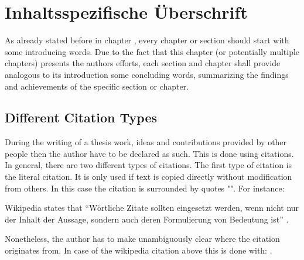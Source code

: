 
\chapter{Inhaltsspezifische Überschrift}
\label{sect:corechapter}


As already stated before in chapter , every chapter or section should start with some introducing words.
Due to the fact that this chapter (or potentially multiple chapters) presents the authors efforts, each section and chapter shall provide analogous to its introduction some concluding words, summarizing the findings and achievements of the specific section or chapter.


\section{Different Citation Types}

During the writing of a thesis work, ideas and contributions provided by other people then the author have to be declared as such.
This is done using citations.
In general, there are two different types of citations.
The first type of citation is the literal citation.
It is only used if text is copied directly without modification from others.
In this case the citation is surrounded by quotes "".
For instance:
\begin{center}
  Wikipedia states that \enquote{Wörtliche Zitate sollten eingesetzt werden, wenn nicht nur der Inhalt der Aussage, sondern auch deren Formulierung von Bedeutung ist} .
\end{center}
Nonetheless, the author has to make unambiguously clear where the citation originates from.
In case of the wikipedia citation above this is done with:  .


